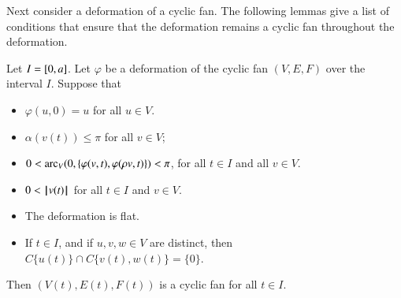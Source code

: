 Next  consider a deformation of a cyclic fan.  The following lemmas give a list of conditions that ensure that the deformation remains a cyclic fan throughout the deformation.


\begin{lemma} 
Let $I = [ 0,a]$.  Let $\varphi$ be a deformation of the cyclic fan $(V,E,F)$ over
the interval $I$.    Suppose that 
\begin{itemize}
\item $\varphi(u,0)=u$ for all $u\in V$. 
\item $\alpha(v(t))\le \pi$ for all $v\in V$;
\item $0 < \operatorname{arc}_V(0,\{\varphi(v,t),\varphi(\rho v,t)\}) < \pi$, for all $t\in I$ and all $v\in V$.
\item $0 < {{\hskip0.1em|\hskip-0.15em|\hskip0.1em}v(t){\hskip0.1em|\hskip-0.15em|\hskip0.1em}}$ for all $t\in I$ and $v\in V$.
\item The deformation is flat.
\item If $t\in I$, and if $u,v,w\in V$ are distinct, 
then $C\{u(t)\}\cap C\{v(t),w(t)\} = \{0\}$.
\end{itemize}
Then $(V(t),E(t),F(t))$ is a cyclic fan for all $t\in I$.
\end{lemma}

